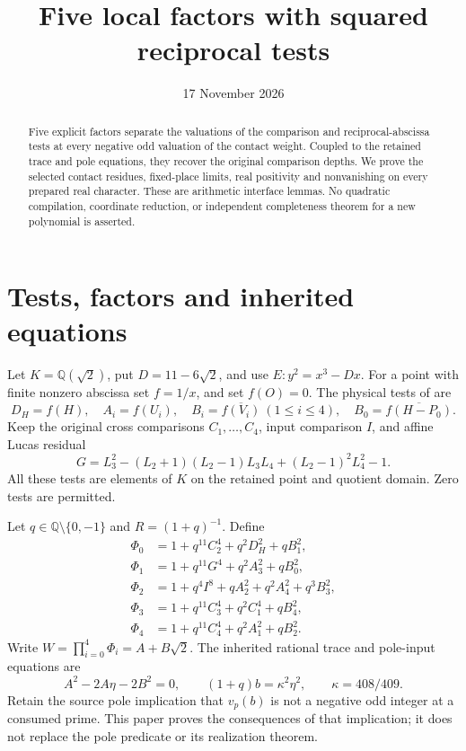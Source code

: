 \documentclass[11pt,a4paper]{article}
\title{Five local factors with squared reciprocal tests}
\author{}\date{17 November 2026}
\newcommand{\Q}{\mathbb Q}\newcommand{\Z}{\mathbb Z}
\begin{document}
\maketitle

\begin{abstract}
Five explicit factors separate the valuations of the comparison and
reciprocal-abscissa tests at every negative odd valuation of the
contact weight. Coupled to the retained trace and pole equations,
they recover the original comparison depths. We prove the selected
contact residues, fixed-place limits, real positivity and nonvanishing
on every prepared real character. These are arithmetic interface
lemmas. No quadratic compilation, coordinate reduction, or independent
completeness theorem for a new polynomial is asserted.
\end{abstract}

\section{Tests, factors and inherited equations}

Let $K=\Q(\sqrt2)$, put $D=11-6\sqrt2$, and use
$E:y^2=x^3-Dx$. For a point with finite nonzero abscissa set
$f=1/x$, and set $f(O)=0$. The physical tests of
\cite{General,Charts,Explicit} are
\[
 D_H=f(H),\quad A_i=f(U_i),\quad
 B_i=\overline{f(V_i)}\ (1\le i\le4),\quad
 B_0=\overline{f(H-P_0)}.
\]
Keep the original cross comparisons $C_1,\ldots,C_4$, input
comparison $I$, and affine Lucas residual
\[
 G=L_3^2-(L_2+1)(L_2-1)L_3L_4+(L_2-1)^2L_4^2-1.
\]
All these tests are elements of $K$ on the retained point and
quotient domain. Zero tests are permitted.

Let $q\in\Q\setminus\{0,-1\}$ and $R=(1+q)^{-1}$.
Define
\begin{equation}\label{eq:factors}
\begin{aligned}
 \Phi_0&=1+q^{11}C_2^4+q^2D_H^2+qB_1^2,\\
 \Phi_1&=1+q^{11}G^4+q^2A_3^2+qB_0^2,\\
 \Phi_2&=1+q^4I^8+qA_2^2+q^2A_4^2+q^3B_3^2,\\
 \Phi_3&=1+q^{11}C_3^4+q^2C_1^4+qB_4^2,\\
 \Phi_4&=1+q^{11}C_4^4+q^2A_1^2+qB_2^2.
\end{aligned}
\end{equation}
Write $W=\prod_{i=0}^4\Phi_i=A+B\sqrt2$. The inherited
rational trace and pole-input equations are
\begin{equation}\label{eq:trace}
 A^2-2A\eta-2B^2=0,\qquad (1+q)b=\kappa^2\eta^2,
                       \qquad \kappa=408/409.
\end{equation}
Retain the source pole implication that $v_p(b)$ is not a negative
odd integer at a consumed prime. This paper proves the consequences
of that implication; it does not replace the pole predicate or its
realization theorem.
\end{document}
